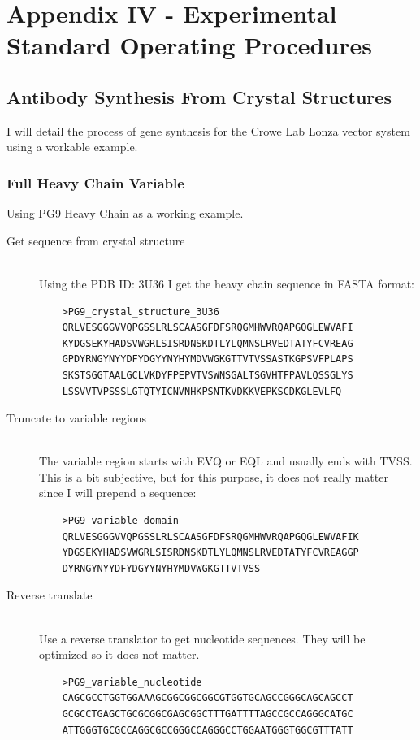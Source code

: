 \section{Appendix IV - Experimental Standard Operating Procedures}
\label{sec:appenixIV}
\subsection{Antibody Synthesis From Crystal Structures}
I will detail the process of gene synthesis for the Crowe Lab Lonza vector system using a workable example.
\singlespacing
\subsubsection{Full Heavy Chain Variable}
Using PG9 Heavy Chain as a working example.
\begin{description}
  \item[Get sequence from crystal structure] \hfill \\
  Using the PDB ID: 3U36 I get the heavy chain sequence in FASTA format:
    \begin{verbatim}
    >PG9_crystal_structure_3U36
    QRLVESGGGVVQPGSSLRLSCAASGFDFSRQGMHWVRQAPGQGLEWVAFI
    KYDGSEKYHADSVWGRLSISRDNSKDTLYLQMNSLRVEDTATYFCVREAG
    GPDYRNGYNYYDFYDGYYNYHYMDVWGKGTTVTVSSASTKGPSVFPLAPS
    SKSTSGGTAALGCLVKDYFPEPVTVSWNSGALTSGVHTFPAVLQSSGLYS
    LSSVVTVPSSSLGTQTYICNVNHKPSNTKVDKKVEPKSCDKGLEVLFQ
    \end{verbatim}
  \item[Truncate to variable regions] \hfill \\
  The variable region starts with EVQ or EQL and usually ends with TVSS. This is a bit subjective, but for this purpose, it does not really matter since I will prepend a sequence:
    \begin{verbatim}
    >PG9_variable_domain
    QRLVESGGGVVQPGSSLRLSCAASGFDFSRQGMHWVRQAPGQGLEWVAFIK
    YDGSEKYHADSVWGRLSISRDNSKDTLYLQMNSLRVEDTATYFCVREAGGP
    DYRNGYNYYDFYDGYYNYHYMDVWGKGTTVTVSS
    \end{verbatim}
  \item[Reverse translate] \hfill \\
  Use a reverse translator to get nucleotide sequences. They will be optimized so it does not matter.
    \begin{verbatim}
    >PG9_variable_nucleotide
    CAGCGCCTGGTGGAAAGCGGCGGCGGCGTGGTGCAGCCGGGCAGCAGCCT
    GCGCCTGAGCTGCGCGGCGAGCGGCTTTGATTTTAGCCGCCAGGGCATGC
    ATTGGGTGCGCCAGGCGCCGGGCCAGGGCCTGGAATGGGTGGCGTTTATT

\end{verbatim}
\end{description}
